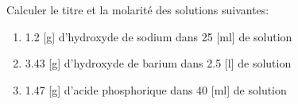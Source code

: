 \documentclass[
  11pt,
  a4paper,
  openany]{book}
\providecommand{\tightlist}{%
  \setlength{\itemsep}{0pt}\setlength{\parskip}{0pt}}
\begin{document}
\newpage

\begin{Exercise}

Calculer le titre et la molarité des solutions suivantes:

\begin{enumerate}
\def\labelenumi{\alph{enumi}.}
\tightlist
\item
  1.2 {[}g{]} d'hydroxyde de sodium dans 25 {[}ml{]} de solution\\
\item
  3.43 {[}g{]} d'hydroxyde de barium dans 2.5 {[}l{]} de solution\\
\item
  1.47 {[}g{]} d'acide phosphorique dans 40 {[}ml{]} de solution\\
\end{enumerate}

\end{Exercise}
\end{document}
